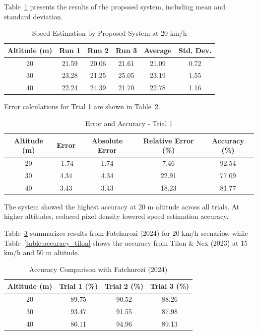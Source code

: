 Table~\ref{table:system_speed_calc} presents the results of the proposed system, including mean and standard deviation.

\begin{table}[htbp]
\centering
\caption{Speed Estimation by Proposed System at 20 km/h}
\label{table:system_speed_calc}
\begin{tabular}{|c|c|c|c|c|c|}
\hline
\textbf{Altitude (m)} & Run 1 & Run 2 & Run 3 & \textbf{Average} & \textbf{Std. Dev.} \\ \hline
20 & 21.59 & 20.06 & 21.61 & 21.09 & 0.72 \\ \hline
30 & 23.28 & 21.25 & 25.05 & 23.19 & 1.55 \\ \hline
40 & 22.24 & 24.39 & 21.70 & 22.78 & 1.16 \\ \hline
\end{tabular}
\end{table}

Error calculations for Trial 1 are shown in Table~\ref{table:error_accuracy_t1}.

\begin{table}[htbp]
\centering
\caption{Error and Accuracy - Trial 1}
\label{table:error_accuracy_t1}
\begin{tabular}{|c|c|c|c|c|}
\hline
\textbf{Altitude (m)} & Error & Absolute Error & Relative Error (\%) & Accuracy (\%) \\ \hline
20 & -1.74 & 1.74 & 7.46 & 92.54 \\ \hline
30 & 4.34 & 4.34 & 22.91 & 77.09 \\ \hline
40 & 3.43 & 3.43 & 18.23 & 81.77 \\ \hline
\end{tabular}
\end{table}

The system showed the highest accuracy at 20 m altitude across all trials. At higher altitudes, reduced pixel density lowered speed estimation accuracy.

Table~\ref{table:accuracy_fatchurozi} summarizes results from Fatchurozi (2024) for 20 km/h scenarios, while Table~\ref{table:accuracy_tilon} shows the accuracy from Tilon \& Nex (2023) at 15 km/h and 50 m altitude.

\begin{table}[htbp]
\centering
\caption{Accuracy Comparison with Fatchurozi (2024)}
\label{table:accuracy_fatchurozi}
\begin{tabular}{|c|c|c|c|}
\hline
\textbf{Altitude (m)} & Trial 1 (\%) & Trial 2 (\%) & Trial 3 (\%) \\ \hline
20 & 89.75 & 90.52 & 88.26 \\ \hline
30 & 93.47 & 91.55 & 87.98 \\ \hline
40 & 86.11 & 94.96 & 89.13 \\ \hline
\end{tabular}
\end{table}

